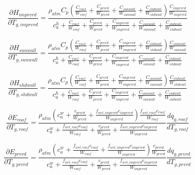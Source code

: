 \documentclass[12pt,authoryear]{elsarticle}
\numberwithin{equation}{section} %
\begin{document}
\begin{equation}
\label{eq:partial_derivatives_sensible_flux_temperature_imprvrd}
\frac{\partial H_{imprvrd}}{\partial T_{g,imprvrd}} = \frac{\rho_{atm}C_{p}\left(\frac{C_{roof}}{W_{roof}}+\frac{C_{prvrd}}{W_{prvrd}}+\frac{C_{sunwall}}{W_{sunwall}}+\frac{C_{shdwall}}{W_{shdwall}}\right)\frac{C_{imprvrd}}{W_{imprvrd}}}{c_{a}^{h}+\frac{C_{roof}}{W_{roof}}+\frac{C_{prvrd}}{W_{prvrd}}+\frac{C_{imprvrd}}{W_{imprvrd}}+\frac{C_{sunwall}}{W_{sunwall}}+\frac{C_{shdwall}}{W_{shdwall}}}
\end{equation}

\begin{equation}
\label{eq:partial_derivatives_sensible_flux_temperature_sunwall}
\frac{\partial H_{sunwall}}{\partial T_{g,sunwall}} = \frac{\rho_{atm}C_{p}\left(\frac{C_{roof}}{W_{roof}}+\frac{C_{prvrd}}{W_{prvrd}}+\frac{C_{imprvrd}}{W_{imprvrd}}+\frac{C_{shdwall}}{W_{shdwall}}\right)\frac{C_{sunwall}}{W_{sunwall}}}{c_{a}^{h}+\frac{C_{roof}}{W_{roof}}+\frac{C_{prvrd}}{W_{prvrd}}+\frac{C_{imprvrd}}{W_{imprvrd}}+\frac{C_{sunwall}}{W_{sunwall}}+\frac{C_{shdwall}}{W_{shdwall}}}
\end{equation}

\begin{equation}
\label{eq:partial_derivatives_sensible_flux_temperature_shdwall}
\frac{\partial H_{shdwall}}{\partial T_{g,shdwall}} = \frac{\rho_{atm}C_{p}\left(\frac{C_{roof}}{W_{roof}}+\frac{C_{prvrd}}{W_{prvrd}}+\frac{C_{imprvrd}}{W_{imprvrd}}+\frac{C_{sunwall}}{W_{sunwall}}\right)\frac{C_{shdwall}}{W_{shdwall}}}{c_{a}^{h}+\frac{C_{roof}}{W_{roof}}+\frac{C_{prvrd}}{W_{prvrd}}+\frac{C_{imprvrd}}{W_{imprvrd}}+\frac{C_{sunwall}}{W_{sunwall}}+\frac{C_{shdwall}}{W_{shdwall}}}
\end{equation}

\begin{equation}
\label{eq:partial_derivatives_latent_flux_temperature_roof}
\frac{\partial E_{roof}}{\partial T_{g,roof}} = \frac{\rho_{atm}\left(c_{a}^{w}+\frac{c_{prvrd}}{W_{prvrd}}+\frac{f_{wet,imprvrd}c_{imprvrd}}{W_{imprvrd}}\right)\frac{f_{wet,roof}c_{roof}}{W_{roof}}}{c_{a}^{w}+\frac{f_{wet,roof}c_{roof}}{W_{roof}}+\frac{c_{prvrd}}{W_{prvrd}}+\frac{f_{wet,imprvrd}c_{imprvrd}}{W_{imprvrd}}}\frac{d q_{g,roof}}{d T_{g,roof}}
\end{equation}

\begin{equation}
\label{eq:partial_derivatives_latent_flux_temperature_prvrd}
\frac{\partial E_{prvrd}}{\partial T_{g,prvrd}} = \frac{\rho_{atm}\left(c_{a}^{w}+\frac{f_{wet,roof}c_{roof}}{W_{roof}}+\frac{f_{wet,imprvrd}c_{imprvrd}}{W_{imprvrd}}\right)\frac{c_{prvrd}}{W_{prvrd}}}{c_{a}^{w}+\frac{f_{wet,roof}c_{roof}}{W_{roof}}+\frac{c_{prvrd}}{W_{prvrd}}+\frac{f_{wet,imprvrd}c_{imprvrd}}{W_{imprvrd}}}\frac{d q_{g,prvrd}}{d T_{g,prvrd}}
\end{equation}
\end{document}

